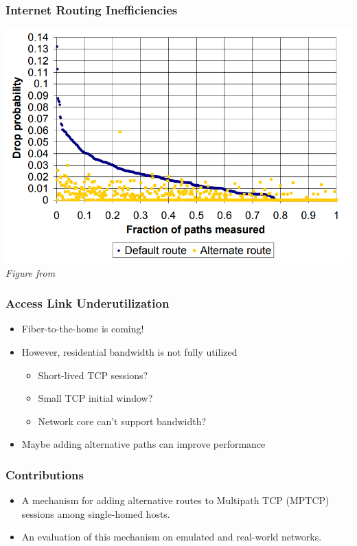 \documentclass{beamer}
\begin{document}
\begin{frame}
  \frametitle{Internet Routing Inefficiencies}

  \includegraphics[height=0.85\textheight]{figures/detour-packetloss.png} \\
  \textit{Figure from \cite{detour}}
\end{frame}

\begin{frame}
  \frametitle{Access Link Underutilization}

  \begin{itemize}
  \item Fiber-to-the-home is coming!
  \item However, residential bandwidth is not fully utilized
    \cite{fibertothehome}
    \begin{itemize}
    \item Short-lived TCP sessions?
    \item Small TCP initial window?
    \item Network core can't support bandwidth?
    \end{itemize}
  \item Maybe adding alternative paths can improve performance
  \end{itemize}
\end{frame}

\begin{frame}
  \frametitle{Contributions}

  \begin{itemize}
  \item A mechanism for adding alternative routes to Multipath TCP (MPTCP)
    sessions among single-homed hosts.
  \item An evaluation of this mechanism on emulated and real-world networks.
  \end{itemize}
\end{frame}
\end{document}
